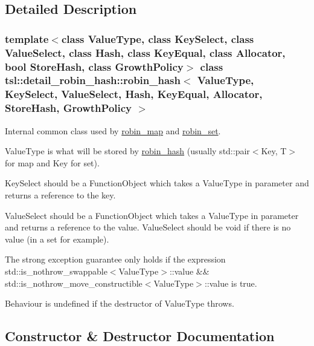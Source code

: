 \subsection{Detailed Description}
\subsubsection*{template$<$class Value\+Type, class Key\+Select, class Value\+Select, class Hash, class Key\+Equal, class Allocator, bool Store\+Hash, class Growth\+Policy$>$\newline
class tsl\+::detail\+\_\+robin\+\_\+hash\+::robin\+\_\+hash$<$ Value\+Type, Key\+Select, Value\+Select, Hash, Key\+Equal, Allocator, Store\+Hash, Growth\+Policy $>$}

Internal common class used by {\ttfamily \mbox{\hyperlink{classtsl_1_1robin__map}{robin\+\_\+map}}} and {\ttfamily \mbox{\hyperlink{classtsl_1_1robin__set}{robin\+\_\+set}}}.

Value\+Type is what will be stored by {\ttfamily \mbox{\hyperlink{classtsl_1_1detail__robin__hash_1_1robin__hash}{robin\+\_\+hash}}} (usually {\ttfamily std\+::pair$<$Key, T$>$} for map and {\ttfamily Key} for set).

{\ttfamily Key\+Select} should be a {\ttfamily Function\+Object} which takes a {\ttfamily Value\+Type} in parameter and returns a reference to the key.

{\ttfamily Value\+Select} should be a {\ttfamily Function\+Object} which takes a {\ttfamily Value\+Type} in parameter and returns a reference to the value. {\ttfamily Value\+Select} should be void if there is no value (in a set for example).

The strong exception guarantee only holds if the expression {\ttfamily std\+::is\+\_\+nothrow\+\_\+swappable$<$Value\+Type$>$\+::value \&\& std\+::is\+\_\+nothrow\+\_\+move\+\_\+constructible$<$Value\+Type$>$\+::value} is true.

Behaviour is undefined if the destructor of {\ttfamily Value\+Type} throws. 

\subsection{Constructor \& Destructor Documentation}
\mbox{\label{classtsl_1_1detail__robin__hash_1_1robin__hash_a6941f1aadf678dc6ac97cf8f6517b3b6}} 
